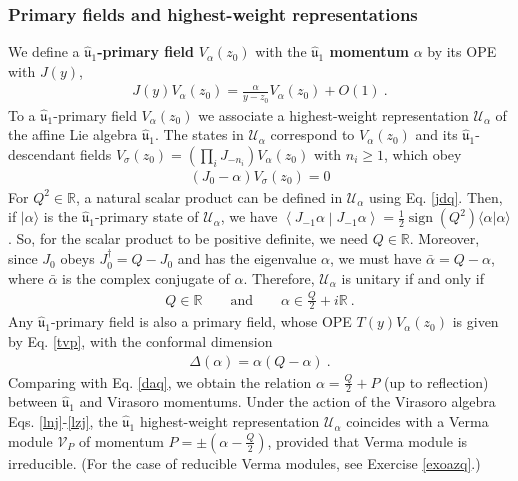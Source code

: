 \documentclass[12pt, a4paper, notitlepage, twoside]{report}
\numberwithin{equation}{section}
\theoremstyle{break}
\begin{document}
\subsubsection{Primary fields and highest-weight representations}

We define a \textbf{\boldmath $\hat{\mathfrak{u}}_1$-primary field} $V_{\alpha}(z_0)$ with the \textbf{\boldmath $\hat{\mathfrak{u}}_1$ momentum} $\alpha$ by its OPE with $J(y)$,
\begin{align}
 \boxed{J(y) V_\alpha(z_0) = \frac{\alpha}{y-z_0} V_\alpha(z_0) + O(1)}\ .
\label{jva}
\end{align}
To a $\hat{\mathfrak{u}}_1$-primary field $V_\alpha(z_0)$ we associate a highest-weight representation $\mathcal{U}_\alpha$ of the  affine Lie algebra $\hat{\mathfrak{u}}_1$.
The states in $\mathcal{U}_\alpha$ correspond to $V_\alpha(z_0)$ and its $\hat{\mathfrak{u}}_1$-descendant fields $V_\sigma(z_0)=\left(\prod_i J_{-n_i}\right) V_\alpha(z_0)$ with $n_i\geq 1$, which obey 
\begin{align}
 \left(J_0 - \alpha\right) V_\sigma(z_0) = 0
\label{jma}
\end{align}
For $Q^2\in\mathbb{R}$, 
a natural scalar product can be defined in $\mathcal{U}_\alpha$ using Eq. \eqref{jdq}.
Then, if $|\alpha\rangle$ is the $\hat{\mathfrak{u}}_1$-primary state of $\mathcal{U}_\alpha$, we have $\left< J_{-1}\alpha\middle|J_{-1}\alpha\right> = \frac12 \operatorname{sign}(Q^2) \langle \alpha|\alpha\rangle$.
So, for the scalar product to be positive definite, we need $Q\in \mathbb{R}$.
Moreover, since $J_0$ obeys $J_0^\dagger = Q-J_0$ and has the eigenvalue $\alpha$, we must have $\bar\alpha = Q-\alpha$, where $\bar \alpha$ is the complex conjugate of $\alpha$.
Therefore, $\mathcal{U}_\alpha$ is unitary if and only if
\begin{align}
 Q\in\mathbb{R} \qquad \text{and} \qquad \alpha \in \frac{Q}{2} + i{\mathbb{R}}\ .
\label{aif}
\end{align}
Any $\hat{\mathfrak{u}}_1$-primary field is also a primary field, whose OPE $T(y)V_\alpha(z_0)$ is given by Eq. \eqref{tvp}, with the conformal dimension 
\begin{align}
 \Delta(\alpha) = \alpha(Q-\alpha)\ .
 \label{daqu}
\end{align}
Comparing with
Eq. \eqref{daq}, we obtain the relation $\alpha = \frac{Q}{2}+P$ (up to reflection) between $\hat{\mathfrak{u}}_1$ and Virasoro momentums. 
Under the action of the Virasoro algebra Eqs. \eqref{lnj}-\eqref{lzj}, the $\hat{\mathfrak{u}}_1$ highest-weight representation $\mathcal{U}_\alpha$ coincides with a Verma module $\mathcal{V}_P$ of momentum $P=\pm(\alpha-\frac{Q}{2})$, provided that Verma module is irreducible. (For the case of reducible Verma modules, see Exercise \ref{exoazq}.)
\end{document}
